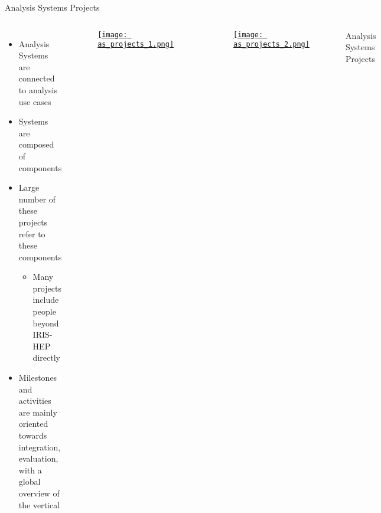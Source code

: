 \begin{frame}{Analysis Systems Projects}
  \begin{columns}
    \begin{itemize}\setlength{\itemsep}{0.25 cm}
      \item Analysis Systems are connected to analysis use cases
      \item Systems are composed of components
      \item Large number of these projects refer to these components
      \begin{itemize}
        \item Many projects include people beyond IRIS-HEP directly
      \end{itemize}
      \item Milestones and activities are mainly oriented towards integration, evaluation, with a global overview of the vertical
    \end{itemize}
%
    \begin{columns}
      \begin{column}{0.5\textwidth}
        \begin{figure}
          \begin{center}
            \href{https://iris-hep.org/as.html}{\texttt{[image: as\_projects\_1.png]}}
          \end{center}
        \end{figure}
      \end{column}
      \begin{column}{0.5\textwidth}
        \begin{figure}
          \begin{center}
            \href{https://iris-hep.org/as.html}{\texttt{[image: as\_projects\_2.png]}}
          \end{center}
        \end{figure}
      \end{column}
    \end{columns}
    \begin{center}
      Analysis Systems Projects
    \end{center}
  \end{columns}
\end{frame}

